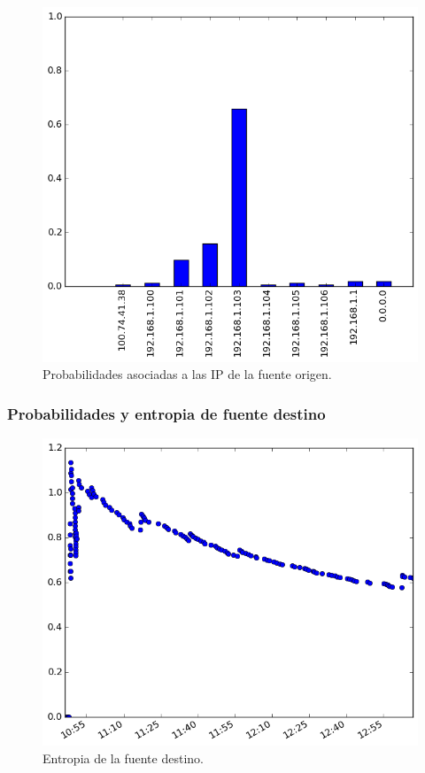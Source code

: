 \begin{figure}[h!]
  \centering
	\includegraphics[scale=0.66]{../experimentacion-svilerino/casa/histogram_src_probabilities.png}
  \caption{Probabilidades asociadas a las IP de la fuente origen.}
	\label{fig:probabilidad-src-casa}
\end{figure}


\subsubsection{Probabilidades y entropia de fuente destino}
\begin{figure}[h!]
  \centering
	\includegraphics[scale=0.66]{../experimentacion-svilerino/casa/entropy_dst.png}
  \caption{Entropia de la fuente destino.}
	\label{fig:entropia-dst-casa}
\end{figure}

